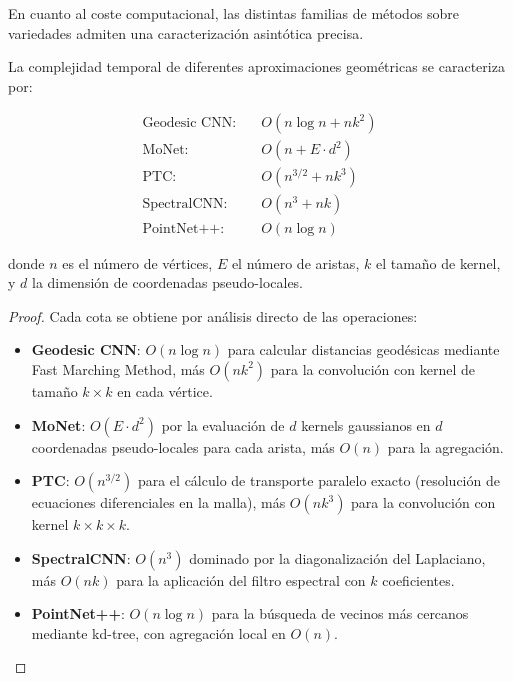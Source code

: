 En cuanto al coste computacional, las distintas familias de métodos sobre variedades admiten una caracterización asintótica precisa.

\begin{proposition}\label{prop:complejidad_aproximaciones_geometricas}
La complejidad temporal de diferentes aproximaciones geométricas se caracteriza por:

\begin{align}
\text{Geodesic CNN}: &\quad O(n \log n + nk^2) \\
\text{MoNet}: &\quad O(n + E \cdot d^2) \\
\text{PTC}: &\quad O(n^{3/2} + nk^3) \\
\text{SpectralCNN}: &\quad O(n^3 + nk) \\
\text{PointNet++}: &\quad O(n \log n)
\end{align}

donde $n$ es el número de vértices, $E$ el número de aristas, $k$ el tamaño de kernel, y $d$ la dimensión de coordenadas pseudo-locales.
\end{proposition}

\begin{proof}
Cada cota se obtiene por análisis directo de las operaciones:
\begin{itemize}
    \item \textbf{Geodesic CNN}: $O(n \log n)$ para calcular distancias geodésicas mediante Fast Marching Method, más $O(nk^2)$ para la convolución con kernel de tamaño $k \times k$ en cada vértice.
    \item \textbf{MoNet}: $O(E \cdot d^2)$ por la evaluación de $d$ kernels gaussianos en $d$ coordenadas pseudo-locales para cada arista, más $O(n)$ para la agregación.
    \item \textbf{PTC}: $O(n^{3/2})$ para el cálculo de transporte paralelo exacto (resolución de ecuaciones diferenciales en la malla), más $O(nk^3)$ para la convolución con kernel $k \times k \times k$.
    \item \textbf{SpectralCNN}: $O(n^3)$ dominado por la diagonalización del Laplaciano, más $O(nk)$ para la aplicación del filtro espectral con $k$ coeficientes.
    \item \textbf{PointNet++}: $O(n \log n)$ para la búsqueda de vecinos más cercanos mediante kd-tree, con agregación local en $O(n)$.
\end{itemize}
\end{proof}

